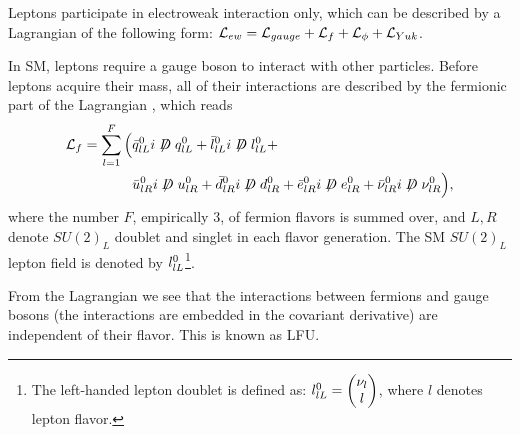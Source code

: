 Leptons participate in electroweak interaction only,
which can be described by a Lagrangian of the following form:
$\mathcal{L}_{ew} = \mathcal{L}_{gauge} + \mathcal{L}_{f} + \mathcal{L}_{\phi} + \mathcal{L}_{Yuk}$.

In SM, leptons require a gauge boson to interact with other particles.
Before leptons acquire their mass, all of their interactions are described by
the fermionic part of the Lagrangian , which
reads \cite{Langacker:2010zza}
\begin{align}
    \Lden{f} = \sum_{l = 1}^F \Big(
        & \bar{\spin{q}}^0_{lL} i \fsl{D} \spin{q}^0_{lL} +
          \bar{\spin{l}}^0_{lL} i \fsl{D} \spin{l}^0_{lL} + \nonumber \\
        & \bar{u}^0_{lR} i \fsl{D} u^0_{lR} +
          \bar{d}^0_{lR} i \fsl{D} d^0_{lR} +
          \bar{e}^0_{lR} i \fsl{D} e^0_{lR} +
          \bar{\nu}^0_{lR} i \fsl{D} \nu^0_{lR}
    \Big),
\end{align}
where the number $F$, empirically 3, of fermion flavors is summed over, and
$L,R$ denote $SU(2)_L$ doublet and singlet in each flavor generation.
The SM $SU(2)_L$ lepton field is denoted by $l^0_{lL}$\footnote{
    The left-handed lepton doublet is defined as:
    $l^0_{lL} = \begin{pmatrix} \nu_l \\ l \end{pmatrix}$,
    where $l$ denotes lepton flavor.
}.

From the Lagrangian we see that the interactions between fermions and gauge
bosons (the interactions are embedded in the  covariant derivative) are
independent of their flavor.
This is known as LFU.
